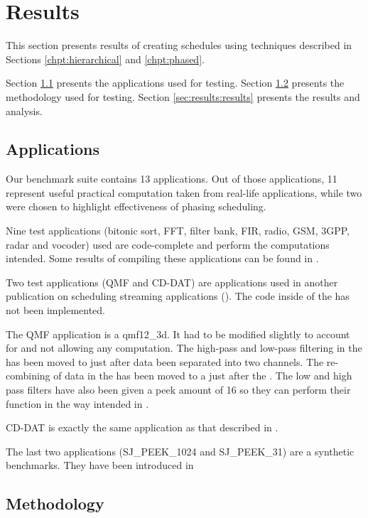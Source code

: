\section{Results}
\label{chpt:results}

This section presents results of creating schedules using
techniques described in Sections \ref{chpt:hierarchical} and
\ref{chpt:phased}.

Section \ref{sec:results:apps} presents the applications used for
testing.  Section \ref{sec:results:methodology} presents the
methodology used for testing. Section \ref{sec:results:results}
presents the results and analysis.

\subsection{Applications}
\label{sec:results:apps}

Our benchmark suite contains 13 applications. Out of those
applications, 11 represent useful practical computation taken from
real-life applications, while two were chosen to highlight
effectiveness of phasing scheduling.

Nine test applications (bitonic sort, FFT, filter bank, FIR,
radio, GSM, 3GPP, radar and vocoder) used are code-complete and
perform the computations intended. Some results of compiling these
applications can be found in \cite{Gordo02}.

Two test applications (QMF and CD-DAT) are applications used in
another publication on scheduling streaming applications
(\cite{murthy99buffer}). The code inside of the {\filters} has not
been implemented.

The QMF application is a qmf12\_3d.  It had to be modified
slightly to account for {\StreamIt} {\splitters} and {\joiners} not
allowing any computation. The high-pass and low-pass filtering in
the {\splitters} has been moved to just after data been separated
into two channels. The re-combining of data in the {\joiners} has
been moved to a {\filter} just after the {\joiners}. The low and high
pass filters have also been given a peek amount of 16 so they can
perform their function in the way intended in {\StreamIt}.

CD-DAT is exactly the same application as that described in
\cite{murthy99buffer}.

The last two applications (SJ\_PEEK\_1024 and SJ\_PEEK\_31) are a
synthetic benchmarks. They have been introduced in
\cite{karczma-thesis}

\subsection{Methodology}
\label{sec:results:methodology}

